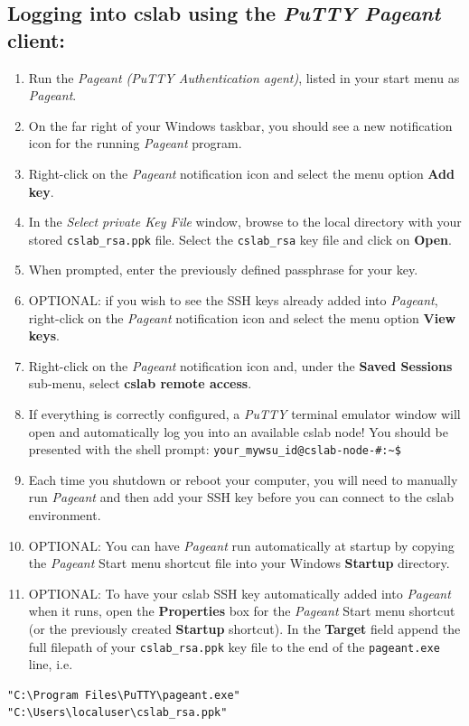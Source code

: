 \documentclass[12pt]{article}
\begin{document}
\begin{flushleft}
\newpage
\subsection*{Logging into cslab using the \textit{PuTTY Pageant} client:}
\begin{enumerate}
  \item Run the \textit{Pageant (PuTTY Authentication agent)}, listed in your start menu as \textit{Pageant}.
  \item On the far right of your Windows taskbar, you should see a new notification icon for the running \textit{Pageant} program.
  \item Right-click on the \textit{Pageant} notification icon and select the menu option \textbf{Add key}.
  \item In the \textit{Select private Key File} window, browse to the local directory with your stored \verb|cslab_rsa.ppk| file. Select the \texttt{cslab\_rsa} key file and click on \textbf{Open}.
  \item When prompted, enter the previously defined passphrase for your key.
  \item OPTIONAL: if you wish to see the SSH keys already added into \textit{Pageant}, right-click on the \textit{Pageant} notification icon and select the menu option \textbf{View keys}.
  \item Right-click on the \textit{Pageant} notification icon and, under the \textbf{Saved Sessions} sub-menu, select \textbf{cslab remote access}.
  \item If everything is correctly configured, a \textit{PuTTY} terminal emulator window will open and automatically log you into an available cslab node! You should be presented with the shell prompt: 
    \verb|your_mywsu_id@cslab-node-#:~$|
  \item Each time you shutdown or reboot your computer, you will need to manually run \textit{Pageant} and then add your SSH key before you can connect to the cslab environment.
  \item OPTIONAL: You can have \textit{Pageant} run automatically at startup by copying the \textit{Pageant} Start menu shortcut file into your Windows \textbf{Startup} directory.
  \item OPTIONAL: To have your cslab SSH key automatically added into \textit{Pageant} when it runs, open the \textbf{Properties} box for the \textit{Pageant} Start menu shortcut (or the previously created \textbf{Startup} shortcut). In the \textbf{Target} field append the full filepath of your \verb|cslab_rsa.ppk| key file to the end of the \verb|pageant.exe| line, i.e.
\end{enumerate}
  \begin{verbatim}
"C:\Program Files\PuTTY\pageant.exe" "C:\Users\localuser\cslab_rsa.ppk"
  \end{verbatim}


\end{flushleft}
\end{document}
